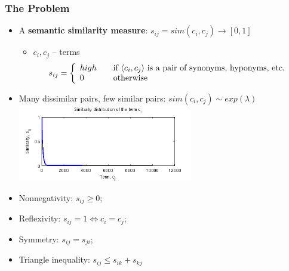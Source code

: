 \documentclass{beamer}
\begin{document}



\begin{frame}



\frametitle{The Problem}

\begin{itemize}
  \item A \textbf{semantic similarity measure}: $s_{ij} = sim(c_i, c_j) \rightarrow [0,1]$
  \begin{itemize}
    \item $c_i, c_j$ -- terms
    $$
  s_{ij} = \left\{ 
   \begin{array}{l l}
     high & \quad \text{if } \langle c_i, c_j \rangle \text{ is a pair of synonyms, hyponyms, etc.} \\
    0 & \quad \text{otherwise}\\
   \end{array} \right.
 $$
    \end{itemize}
  \item Many dissimilar pairs, few similar pairs: $sim(c_i,c_j) \sim exp(\lambda)$
   \includegraphics[width=0.6\textwidth]{figures/simdist}
   
     \item Nonnegativity: $s_{ij} \geq 0$;
     \item Reflexivity: $s_{ij} = 1 \Leftrightarrow c_i = c_j$;
     \item Symmetry: $s_{ij} = s_{ji}$;
     \item Triangle inequality: $s_{ij} \leq s_{ik} + s_{kj}$  
   \end{itemize}   
\end{frame}
   
\end{document}
